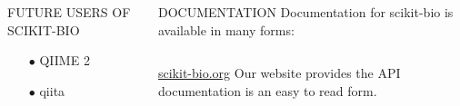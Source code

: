 \documentclass[final,t]{beamer}
\begin{document}
\begin{frame}{}
\begin{columns}[t]
\begin{column}{.3\linewidth}
        \begin{block}{\uppercase{Future Users of scikit-bio}}
            \large{\begin{itemize}
              \item[$\bullet$] QIIME 2
              \item[$\bullet$] qiita
          \end{itemize}}
        \end{block}







    \end{column}
    \begin{column}{.3\linewidth}


        \begin{block}{\uppercase{Documentation}}
            Documentation for scikit-bio is available in many forms:
            \newline\newline
            \begin{columns}
                \begin{column}{.45\linewidth}
                    \begin{minipage}[c][15cm][c]{\linewidth}
                        \href{http://scikit-bio.org}{\color{blue}\underline{scikit-bio.org}}
                        \newline\newline
                        Our website provides the API documentation is an easy to read form.


\end{minipage}
\end{column}
\end{columns}
\end{block}
\end{column}
\end{columns}
\end{frame}
\end{document}
